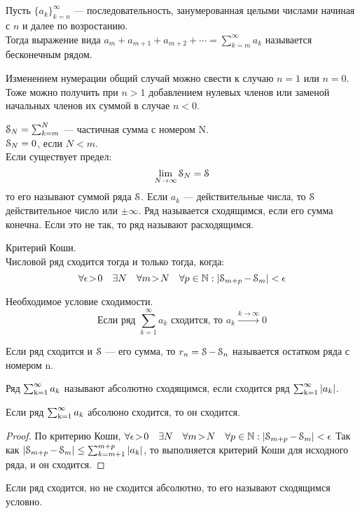 \chapter{}
\begin{deff}
Пусть $ \{a_k \}_{k=n}^{\infty} $ --- последовательность, занумерованная целыми числами начиная с $ n $ и далее по возростанию.\\
Тогда выражение вида $a_m+a_{m+1}+a_{m+2}+ \cdots = \sum_{k=m}^{\infty} a_k$ называется бесконечным рядом.\\
\end{deff}
Изменением нумерации общий случай можно свести к случаю $n=1$ или $n=0$.
Тоже можно получить при $n>1$ добавлением нулевых членов или заменой начальных членов их суммой в случае $n<0$.
\begin{deff}
$ \operatorname{\EuScript{S}}_{N} = \sum_{k=m}^{N} $ --- частичная сумма с номером N.\\
$ \operatorname{\EuScript{S}}_{N} = 0 $, если $ N < m $.\\
Если существует предел:
$$ \lim_{N \to \infty} {\operatorname{\EuScript{S}}_N} = \operatorname{\EuScript{S}} $$
то его называют суммой ряда $\operatorname{\EuScript{S}}$. Если $a_k$ --- действительные числа, то $\operatorname{\EuScript{S}}$ действительное число или $\pm \infty$.
Ряд называется сходящимся, если его сумма конечна. 
Если это не так, то ряд называют расходящимся.
\end{deff}
\begin{st}Критерий Коши.\\
Числовой ряд сходится тогда и только тогда, когда:
$$ \forall{\epsilon\!>\! 0} \quad \exists N \quad \forall m \! >\! N \quad \forall p \in \operatorname{\mathbb{N}} : \left| \operatorname{\EuScript{S}}_{m+p} - \operatorname{\EuScript{S}}_m \right| < \epsilon$$ 
\end{st}
\begin{st}Необходимое условие сходимости.\\
$$ \mbox{Если ряд } \sum_{k=1}^{\infty} a_k \mbox{ сходится, то } a_k \xrightarrow{k\to\infty}0$$
\end{st}
\begin{deff}
Если ряд сходится и $\operatorname{\EuScript{S}}$ --- его сумма, то $r_n = \operatorname{\EuScript{S}} - \operatorname{\EuScript{S}}_n$ называется остатком ряда с номером n.%
\end{deff}
\begin{deff}
Ряд $\operatorname{\sum_{k=1}^{\infty}} a_k $ называют абсолютно сходящимся, если сходится ряд $\operatorname{\sum_{k=1}^{\infty}} |a_k| $.
\end{deff}
\begin{thm}
Если ряд $\operatorname{\sum_{k=1}^{\infty}} a_k$ абсолюно сходится, то он сходится.
\end{thm}
\begin{proof}
По критерию Коши, $ \forall{\epsilon\!>\! 0} \quad \exists N \quad \forall m \! >\! N \quad \forall p \in \operatorname{\mathbb{N}} : \left| \operatorname{\EuScript{S}}_{m+p} - \operatorname{\EuScript{S}}_m \right| < \epsilon$
Так как $\left| \operatorname{\EuScript{S}}_{m+p} - \operatorname{\EuScript{S}}_m \right| \le \sum_{k=m+1}^{m+p}|a_k|$, то выполняется критерий Коши для исходного ряда, и он сходится.
\end{proof}
\begin{deff}
Если ряд сходится, но не сходится абсолютно, то его называют сходящимся условно.
\end{deff}
